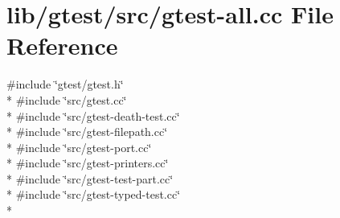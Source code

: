 \hypertarget{src_2gtest-all_8cc}{\section{lib/gtest/src/gtest-\/all.cc File Reference}
\label{src_2gtest-all_8cc}
}
{\ttfamily \#include \char`\"{}gtest/gtest.\-h\char`\"{}}\\*
{\ttfamily \#include \char`\"{}src/gtest.\-cc\char`\"{}}\\*
{\ttfamily \#include \char`\"{}src/gtest-\/death-\/test.\-cc\char`\"{}}\\*
{\ttfamily \#include \char`\"{}src/gtest-\/filepath.\-cc\char`\"{}}\\*
{\ttfamily \#include \char`\"{}src/gtest-\/port.\-cc\char`\"{}}\\*
{\ttfamily \#include \char`\"{}src/gtest-\/printers.\-cc\char`\"{}}\\*
{\ttfamily \#include \char`\"{}src/gtest-\/test-\/part.\-cc\char`\"{}}\\*
{\ttfamily \#include \char`\"{}src/gtest-\/typed-\/test.\-cc\char`\"{}}\\*

